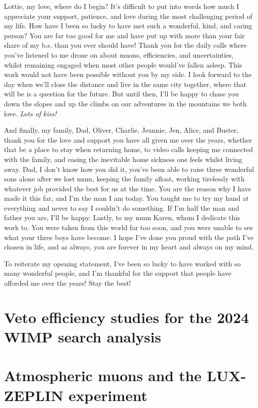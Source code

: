 \documentclass[a4paper,11pt,usegeometry]{scrreprt} %
\begin{document}
Lottie, my love, where do I begin? It's difficult to put into words how much I appreciate your support, patience, and love during the most challenging period of my life. How have I been so lucky to have met such a wonderful, kind, and caring person? You are far too good for me and have put up with more than your fair share of my b.s. than you ever should have! Thank you for the daily calls where you've listened to me drone on about muons, efficiencies, and uncertainties, whilst remaining engaged when most other people would've fallen asleep. This work would not have been possible without you by my side. I look forward to the day when we'll close the distance and live in the same city together, where that will be is a question for the future. But until then, I'll be happy to chase you down the slopes and up the climbs on our adventures in the mountains we both love. \textit{Lots of kiss!}

And finally, my family, Dad, Oliver, Charlie, Jeannie, Jen, Alice, and Buster, thank you for the love and support you have all given me over the years, whether that be a place to stay when returning home, to video calls keeping me connected with the family, and easing the inevitable home sickness one feels whilst living away. Dad, I don't know how you did it, you've been able to raise three wonderful sons alone after we lost mum, keeping the family afloat, working tirelessly with whatever job provided the best for us at the time. You are the reason why I have made it this far, and I'm the man I am today. You taught me to try my hand at everything and never to say I couldn't do something. If I'm half the man and father you are, I'll be happy. Lastly, to my mum Karen, whom I dedicate this work to. You were taken from this world far too soon, and you were unable to see what your three boys have become. I hope I've done you proud with the path I've chosen in life, and as always, you are forever in my heart and always on my mind.

To reiterate my opening statement, I've been so lucky to have worked with so many wonderful people, and I'm thankful for the support that people have afforded me over the years! Stay the best!

\singlespacing
\tableofcontents
\listoffigures	%
\listoftables  %
\clearpage
{}
\doublespacing %








\printbibliography[heading=bibintoc,title={Bibliography}]
\appendix
\chapter{Veto efficiency studies for the 2024 WIMP search analysis}\label{app:VetoEff}

\chapter{Atmospheric muons and the LUX-ZEPLIN experiment}\label{app:Muons}

\end{document}
